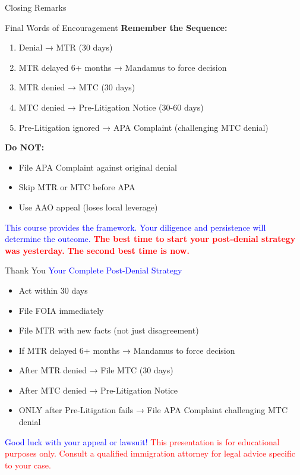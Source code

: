 \documentclass[11pt]{beamer}
\begin{document}
	\begin{frame}{Closing Remarks}
		\scriptsize
		\begin{block}{Final Words of Encouragement}
			\textbf{Remember the Sequence:}
			\begin{enumerate}
				\item Denial → MTR (30 days)
				\item MTR delayed 6+ months → Mandamus to force decision
				\item MTR denied → MTC (30 days)
				\item MTC denied → Pre-Litigation Notice (30-60 days)
				\item Pre-Litigation ignored → APA Complaint (challenging MTC denial)
			\end{enumerate}
			\textbf{Do NOT:}
			\begin{itemize}
				\item File APA Complaint against original denial
				\item Skip MTR or MTC before APA
				\item Use AAO appeal (loses local leverage)
			\end{itemize}
			\vspace{0.3cm}
			\textcolor{blue}{This course provides the framework. Your diligence and persistence will determine the outcome.}
			\vspace{0.3cm}
			\textcolor{red}{\textbf{The best time to start your post-denial strategy was yesterday.}}
			\textcolor{red}{\textbf{The second best time is now.}}
		\end{block}
	\end{frame}
	
	\begin{frame}{Thank You}
		\centering
		\vspace{1cm}
		\textcolor{blue}{\Large Your Complete Post-Denial Strategy}
		\vspace{0.5cm}
		\begin{itemize}
			\item Act within 30 days
			\item File FOIA immediately
			\item File MTR with new facts (not just disagreement)
			\item If MTR delayed 6+ months → Mandamus to force decision
			\item After MTR denied → File MTC (30 days)
			\item After MTC denied → Pre-Litigation Notice
			\item ONLY after Pre-Litigation fails → File APA Complaint challenging MTC denial
		\end{itemize}
		\vspace{0.5cm}
		\textcolor{blue}{\Large Good luck with your appeal or lawsuit!}
		\vspace{0.5cm}
		\textcolor{red}{This presentation is for educational purposes only. Consult a qualified immigration attorney for legal advice specific to your case.}
	\end{frame}
	
\end{document}
